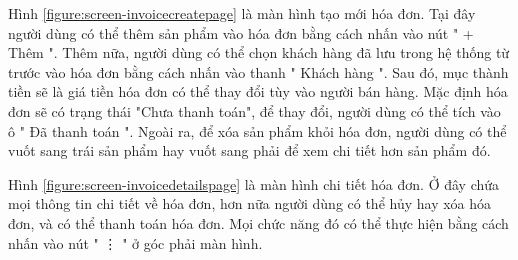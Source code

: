 \documentclass[../DoAn.tex]{subfiles}
\begin{document}
Hình \ref{figure:screen-invoicecreatepage} là màn hình tạo mới hóa đơn. Tại đây người dùng có thể thêm sản phẩm vào hóa đơn bằng cách nhấn vào nút " + Thêm ". Thêm nữa, người dùng có thể chọn khách hàng đã lưu trong hệ thống từ trước vào hóa đơn bằng cách nhấn vào thanh " Khách hàng ". Sau đó, mục thành tiền sẽ là giá tiền hóa đơn có thể thay đổi tùy vào người bán hàng. Mặc định hóa đơn sẽ có trạng thái "Chưa thanh toán", để thay đổi, người dùng có thể tích vào ô " Đã thanh toán ". Ngoài ra, để xóa sản phẩm khỏi hóa đơn, người dùng có thể vuốt sang trái sản phẩm hay vuốt sang phải để xem chi tiết hơn sản phẩm đó.

Hình \ref{figure:screen-invoicedetailspage} là màn hình chi tiết hóa đơn. Ở đây chứa mọi thông tin chi tiết về hóa đơn, hơn nữa người dùng có thể hủy hay xóa hóa đơn, và có thể thanh toán hóa đơn. Mọi chức năng đó có thể thực hiện bằng cách nhấn vào nút " \vdots{} " ở góc phải màn hình.
\end{document}
